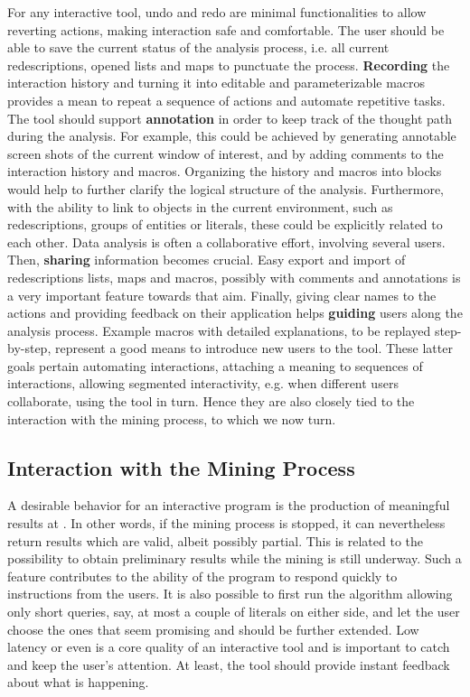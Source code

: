 For any interactive tool, undo and redo are minimal functionalities to
allow reverting actions, making interaction safe and comfortable.  The
user should be able to save the current status of the analysis
process, i.e. all current redescriptions, opened lists and maps to
punctuate the process. \textbf{Recording} the interaction history and
turning it into editable and parameterizable macros provides a mean to
repeat a sequence of actions and automate repetitive tasks.  The tool
should support \textbf{annotation} in order to keep track of the
thought path during the analysis.  For example, this could be achieved
by generating annotable screen shots of the current window of
interest, and by adding comments to the interaction history and
macros.  Organizing the history and macros into blocks would help to further
clarify the logical structure of the analysis.  Furthermore, with
the ability to link to objects in the current environment, such as
redescriptions, groups of entities or literals, these could be
explicitly related to each other.  Data analysis is often a
collaborative effort, involving several users. Then, \textbf{sharing}
information becomes crucial.  Easy export and import of redescriptions
lists, maps and macros, possibly with comments and annotations is a
very important feature towards that aim.  Finally, giving clear names
to the actions and providing feedback on their application helps
\textbf{guiding} users along the analysis process. Example macros with
detailed explanations, to be replayed step-by-step, represent a good
means to introduce new users to the tool.  These latter goals pertain
automating interactions, attaching a meaning to sequences of
interactions, allowing segmented interactivity, e.g. when different
users collaborate, using the tool in turn. Hence they are also closely
tied to the interaction with the mining process, to which we now turn.

\subsection{Interaction with the Mining Process}
\label{sec:goals-interaction}

A desirable behavior for an interactive program is the production of
meaningful results at .  In other words, if the mining
process is stopped, it can nevertheless return results which are
valid, albeit possibly partial.  This is related to the possibility to
obtain preliminary results while the mining is still underway.  Such a
feature contributes to the ability of the program to respond quickly
to instructions from the users.  It is also possible to first run the
algorithm allowing only short queries, say, at most a couple of
literals on either side, and let the user choose the ones that seem
promising and should be further extended. Low latency or even
 is a core quality of an interactive tool and is
important to catch and keep the user's attention. At least, the tool
should provide instant feedback about what is happening.

